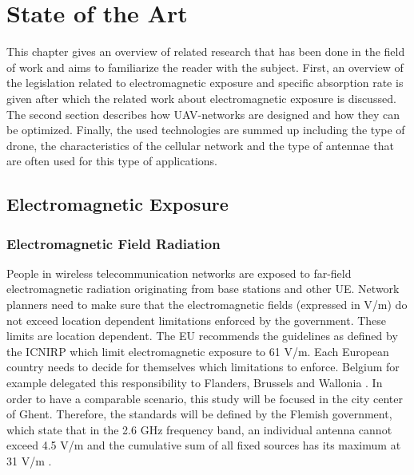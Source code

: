 \chapter{State of the Art}
\label{chap:stateoftheart}

This chapter gives an overview of related research that has been done in the field of work
and aims to familiarize the reader with the subject. First, 
an overview of the legislation related to electromagnetic exposure and specific absorption rate
is given after which the related work about electromagnetic exposure is discussed.
The second section describes how UAV-networks are designed and how they can be optimized.
Finally, the used technologies are summed up including the type of drone, 
the characteristics of the cellular network and the type of antennae that are often used for this 
type of applications.

\section{Electromagnetic Exposure}

\subsection{Electromagnetic Field Radiation} %
\label{sub:emf}
People in wireless telecommunication networks are exposed to far-field electromagnetic radiation originating from base stations and other \gls{UE}. 
Network planners need to make sure
that the electromagnetic fields (expressed in V/m) do not exceed location dependent limitations enforced by the
government. 
These limits are location dependent. The \gls{EU} recommends the guidelines as defined by the \gls{ICNIRP} which limit electromagnetic exposure to 61 V/m.
Each European country needs to decide for themselves which limitations to enforce. Belgium for example delegated this responsibility to Flanders, Brussels and Wallonia \cite{J23}.
In order to have a comparable scenario, this study will be focused in the city center of Ghent. Therefore, the standards will be defined by the Flemish government, 
which state that in the 2.6 GHz frequency band, an individual antenna cannot exceed 4.5 V/m and the cumulative sum of all 
fixed sources has its maximum at 31 V/m \cite{J23, S13_normenBelgie}.

